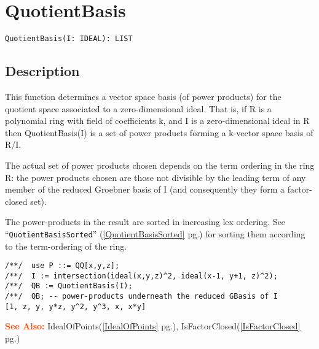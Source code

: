 \documentclass[a4paper]{mybook}
\newenvironment{command}{}{} %
\newcommand\SeeAlso{\par\textcolor{OrangeRed}{\textbf{\large See Also: }}}
\begin{document}
\section{QuotientBasis}
\label{QuotientBasis}
\begin{command} %


\begin{Verbatim}[label=syntax, rulecolor=\color{MidnightBlue},
frame=single]
QuotientBasis(I: IDEAL): LIST
\end{Verbatim}


\subsection*{Description}

This function determines a vector space basis (of power products)
for the quotient space associated to a zero-dimensional ideal.
That is, if R is a polynomial ring with field of coefficients k, and
I is a zero-dimensional ideal in R then QuotientBasis(I) is a set of
power products forming a k-vector space basis of R/I.
\par 
The actual set of power products chosen depends on the term ordering
in the ring R: the power products chosen are those not divisible by
the leading term of any member of the reduced Groebner basis of I
(and consequently they form a factor-closed set).
\par 
The power-products in the result are sorted in increasing lex ordering.  
See ``\verb&QuotientBasisSorted&'' (\ref{QuotientBasisSorted} pg.\pageref{QuotientBasisSorted}) for sorting them according to the 
term-ordering of the ring.
\begin{Verbatim}[label=example, rulecolor=\color{PineGreen}, frame=single]
/**/  use P ::= QQ[x,y,z];
/**/  I := intersection(ideal(x,y,z)^2, ideal(x-1, y+1, z)^2);
/**/  QB := QuotientBasis(I);
/**/  QB; -- power-products underneath the reduced GBasis of I
[1, z, y, y*z, y^2, y^3, x, x*y]
\end{Verbatim}


\SeeAlso %
  IdealOfPoints(\ref{IdealOfPoints} pg.\pageref{IdealOfPoints}), 
    IsFactorClosed(\ref{IsFactorClosed} pg.\pageref{IsFactorClosed})
\end{command} %
\end{document}
